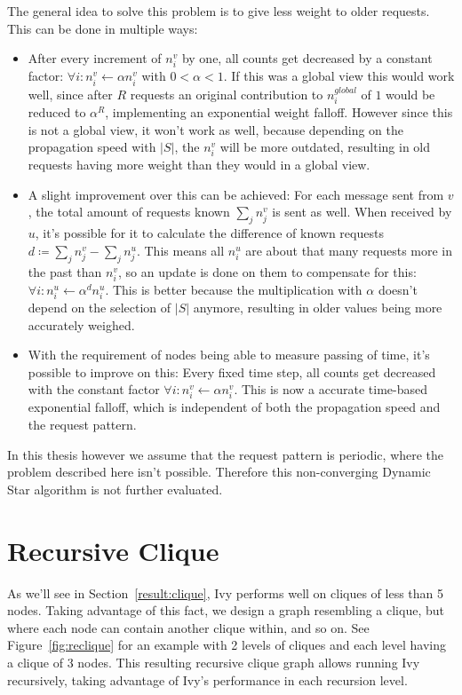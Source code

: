 \documentclass[a4paper, oneside]{discothesis}
\begin{document}
The general idea to solve this problem is to give less weight to older requests. This can be done in multiple ways:
\begin{itemize}
\item After every increment of $n_i^v$ by one, all counts get decreased by a constant factor: $\forall i:n_i^v\gets \alpha n_i^v$ with $0<\alpha<1$. If this was a global view this would work well, since after $R$ requests an original contribution to $n_i^{global}$ of $1$ would be reduced to $\alpha^R$, implementing an exponential weight falloff. However since this is not a global view, it won't work as well, because depending on the propagation speed with $|S|$, the $n_i^v$ will be more outdated, resulting in old requests having more weight than they would in a global view.
\item A slight improvement over this can be achieved: For each message sent from $v$, the total amount of requests known $\sum_jn_j^v$ is sent as well. When received by $u$, it's possible for it to calculate the difference of known requests $d\coloneqq\sum_jn_j^v-\sum_jn_j^u$. This means all $n_i^u$ are about that many requests more in the past than $n_i^v$, so an update is done on them to compensate for this: $\forall i:n_i^u\gets\alpha^dn_i^u$. This is better because the multiplication with $\alpha$ doesn't depend on the selection of $|S|$ anymore, resulting in older values being more accurately weighed.
\item With the requirement of nodes being able to measure passing of time, it's possible to improve on this: Every fixed time step, all counts get decreased with the constant factor $\forall i:n_i^v\gets \alpha n_i^v$. This is now a accurate time-based exponential falloff, which is independent of both the propagation speed and the request pattern.
\end{itemize}

In this thesis however we assume that the request pattern is periodic, where the problem described here isn't possible. Therefore this non-converging Dynamic Star algorithm is not further evaluated.

\section{Recursive Clique}

As we'll see in Section~\ref{result:clique}, Ivy performs well on cliques of less than 5 nodes. Taking advantage of this fact, we design a graph resembling a clique, but where each node can contain another clique within, and so on. See Figure~\ref{fig:reclique} for an example with 2 levels of cliques and each level having a clique of 3 nodes. This resulting recursive clique graph allows running Ivy recursively, taking advantage of Ivy's performance in each recursion level.
\end{document}
